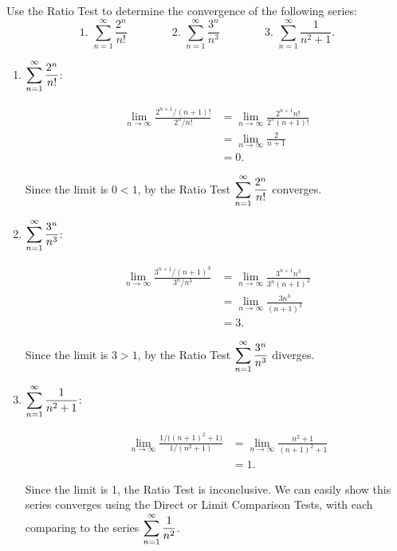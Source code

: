 
\begin{example}\label{ex_ratio1}%
Use the Ratio Test to determine the convergence of the following series:
\[
 \text{1. }\sum_{n=1}^\infty \frac{2^n}{n!}\qquad\qquad
 \text{2. }\sum_{n=1}^\infty \frac{3^n}{n^3}\qquad\qquad
 \text{3. }\sum_{n=1}^\infty \frac{1}{n^2+1}.
\]
\solution
\begin{enumerate}
	\item $\displaystyle \sum_{n=1}^\infty \frac{2^n}{n!}$:\\[-3\baselineskip]\parbox[t]{\linewidth}{%
	\begin{align*}
		\lim_{n\to\infty}\frac{2^{n+1}/(n+1)!}{2^n/n!}
		&= \lim_{n\to\infty} \frac{2^{n+1}n!}{2^n(n+1)!}\\
		&= \lim_{n\to\infty} \frac{2}{n+1}\\
		&=0.
	\end{align*}}
	Since the limit is $0<1$, by the Ratio Test $\displaystyle\sum_{n=1}^\infty \frac{2^n}{n!}$ converges.
	
	\item	$\displaystyle\sum_{n=1}^\infty \frac{3^n}{n^3}$:\\[-3\baselineskip]\parbox[t]{\linewidth}{%
	\begin{align*}
		\lim_{n\to\infty} \frac{3^{n+1}/(n+1)^3}{3^n/n^3}
		&= \lim_{n\to\infty}\frac{3^{n+1}n^3}{3^n(n+1)^3}\\
		&= \lim_{n\to\infty} \frac{3n^3}{(n+1)^3}\\
		&= 3.
	\end{align*}}
	Since the limit is $3>1$, by the Ratio Test $\displaystyle\sum_{n=1}^\infty \frac{3^n}{n^3}$ diverges.
	
	\item  $\displaystyle\sum_{n=1}^\infty \frac{1}{n^2+1}$:\\[-3\baselineskip]\parbox[t]{\linewidth}{%
	\begin{align*}
		\qquad\lim_{n\to\infty} \frac{1/\bigl((n+1)^2+1\bigr)}{1/(n^2+1)}
		&= \lim_{n\to\infty} \frac{n^2+1}{(n+1)^2+1}\\
		&= 1.
	\end{align*}}
	Since the limit is 1, the Ratio Test is inconclusive. We can easily show this series converges using the Direct or Limit Comparison Tests, with each comparing to the series $\displaystyle \sum_{n=1}^\infty \frac{1}{n^2}$.
\end{enumerate}
\end{example}

